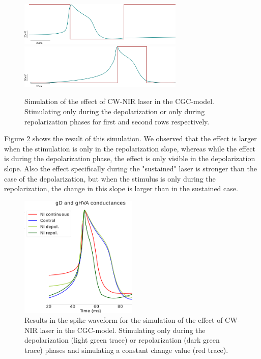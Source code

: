 \begin{figure}[htb!]
	\centering
	\includegraphics[width=0.7\textwidth]{img/laser/activity-dependent-model/depol_model.png}
	\includegraphics[width=0.7\textwidth]{img/laser/activity-dependent-model/repol_model.png}
	\caption{Simulation of the effect of CW-NIR laser in the CGC-model. Stimulating only during the depolarization or only during repolarization phases for first and second rows respectively.}
	\label{fig:activity dependent model stimulation}
\end{figure}

Figure \ref{fig:activity dependent simulation results} shows the result of this simulation. We observed that the effect is larger when the stimulation is only in the repolarization slope, whereas while the effect is during the depolarization phase, the effect is only visible in the depolarization slope. Also the effect specifically during the "sustained" laser is stronger than the case of the depolarization, but when the stimulus is only during the repolarization, the change in this slope is larger than in the sustained case.

\begin{figure}[htb!]
	\centering
	\includegraphics[width=0.5\textwidth]{img/laser/activity-dependent-model/depol_combined.png}
	\caption{Results in the spike waveform for the simulation of the effect of CW-NIR laser in the CGC-model. Stimulating only during the depolarization (light green trace) or repolarization (dark green trace) phases and simulating a constant change value (red trace).}
	\label{fig:activity dependent simulation results}
\end{figure}


